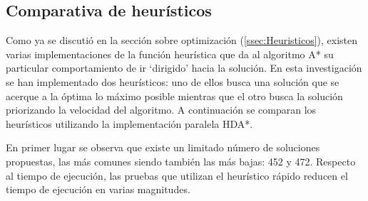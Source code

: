 \subsection{Comparativa de heurísticos}

Como ya se discutió en la sección sobre optimización (\ref{ssec:Heuristicos}),
existen varias implementaciones de la función heurística que da al algoritmo
A* su particular comportamiento de ir `dirigido' hacia la solución.
En esta investigación se han implementado dos heurísticos:
uno de ellos busca una solución que se acerque a la óptima lo máximo posible
mientras que el otro busca la solución priorizando la velocidad del algoritmo.
A continuación se comparan los heurísticos utilizando la implementación paralela HDA*.

En primer lugar se observa que existe un limitado número de soluciones
propuestas, las más comunes siendo también las más bajas: 452 y 472.
Respecto al tiempo de ejecución, las pruebas que utilizan el heurístico rápido
reducen el tiempo de ejecución en varias magnitudes.


